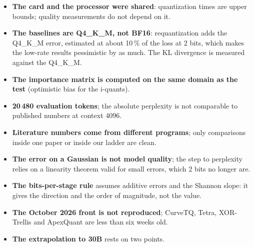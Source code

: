 \begin{faux}
\begin{itemize}
\item \textbf{The card and the processor were shared}: quantization times are upper bounds; quality measurements do not depend on it.
\item \textbf{The baselines are Q4\_K\_M, not BF16}: requantization adds the Q4\_K\_M error, estimated at about 10\,\% of the loss at 2 bits, which makes the low-rate results pessimistic by as much. The KL divergence is measured against the Q4\_K\_M.
\item \textbf{The importance matrix is computed on the same domain as the test} (optimistic bias for the i-quants).
\item \textbf{20\,480 evaluation tokens}; the absolute perplexity is not comparable to published numbers at context 4096.
\item \textbf{Literature numbers come from different programs}; only comparisons inside one paper or inside our ladder are clean.
\item \textbf{The error on a Gaussian is not model quality}; the step to perplexity relies on a linearity theorem valid for small errors, which 2 bits no longer are.
\item \textbf{The bits-per-stage rule} assumes additive errors and the Shannon slope: it gives the direction and the order of magnitude, not the value.
\item \textbf{The October 2026 front is not reproduced}; CurveTQ, Tetra, XOR-Trellis and ApexQuant are less than six weeks old.
\item \textbf{The extrapolation to 30B} rests on two points.
\end{itemize}
\end{faux}
